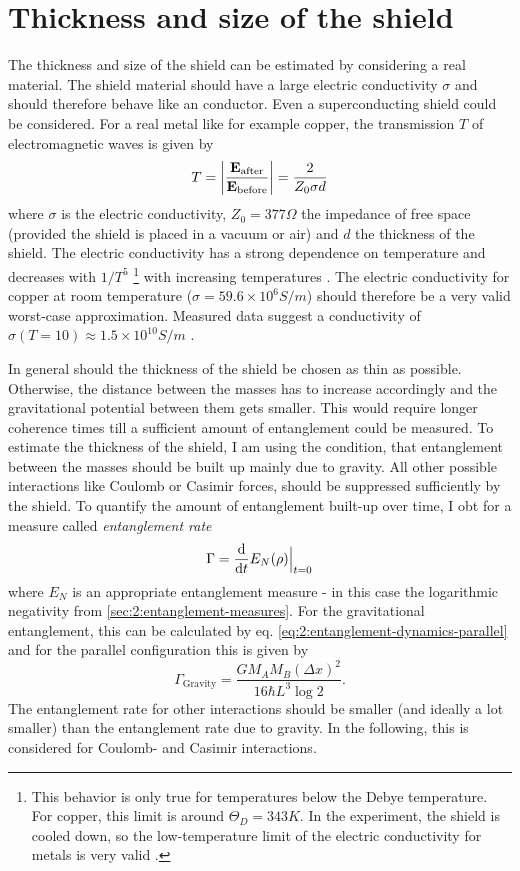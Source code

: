 \section{Thickness and size of the shield}
The thickness and size of the shield can be estimated by considering a real material. The shield material should have a large electric conductivity $\sigma$ and should therefore behave like an conductor. Even a superconducting shield could be considered.
For a real metal like for example copper, the transmission $T$ of electromagnetic waves is given by \cite{Vandenbosch_2022}
\begin{equation}
  T = \abs{\frac{\vec{E}_\mathrm{after}}{\vec{E}_\mathrm{before}}} = \frac{2}{Z_0 \sigma d}
\end{equation}
where $\sigma$ is the electric conductivity, $Z_0 = 377\si{\Omega}$ the impedance of free space (provided the shield is placed in a vacuum or air) and $d$ the thickness of the shield.
The electric conductivity has a strong dependence on temperature and decreases with $1/T^5$ \footnote{This behavior is only true for temperatures below the Debye temperature. For copper, this limit is around $\Theta_D = 343\si{K}$. In the experiment, the shield is cooled down, so the low-temperature limit of the electric conductivity for metals is very valid \cite{Berman_1952}.} with increasing temperatures \cite[p. 284-286]{Gross_2018}. The electric conductivity for copper at room temperature ($\sigma = 59.6\times 10^6 \si{S/m}$) should therefore be a very valid worst-case approximation. 
Measured data suggest a conductivity of $\sigma(T = 10) \approx 1.5\times 10^{10}\si{S/m}$ \cite{Berman_1952}.

In general should the thickness of the shield be chosen as thin as possible. Otherwise, the distance between the masses has to increase accordingly and the gravitational potential between them gets smaller. This would require longer coherence times till a sufficient amount of entanglement could be measured.
To estimate the thickness of the shield, I am using the condition, that entanglement between the masses should be built up mainly due to gravity. All other possible interactions like Coulomb or Casimir forces, should be suppressed sufficiently by the shield.
To quantify the amount of entanglement built-up over time, I obt for a measure called \emph{entanglement rate}
\begin{equation}\label{eq:4:entanglement-rate}
  \Gamma = \dv{t} E_N(\rho)\Big|_{t=0}
\end{equation} 
where $E_N$ is an appropriate entanglement measure - in this case the logarithmic negativity from \cref{sec:2:entanglement-measures}.
For the gravitational entanglement, this can be calculated by eq. \eqref{eq:2:entanglement-dynamics-parallel} and for the parallel configuration this is given by
\begin{equation}\label{eq:4:entanglement-rate-gravity}
  \Gamma_\mathrm{Gravity} = \frac{G M_A M_B (\Delta x)^2}{16 \hbar L^3 \log 2} .
\end{equation}
The entanglement rate for other interactions should be smaller (and ideally a lot smaller) than the entanglement rate due to gravity.
In the following, this is considered for Coulomb- and Casimir interactions.

